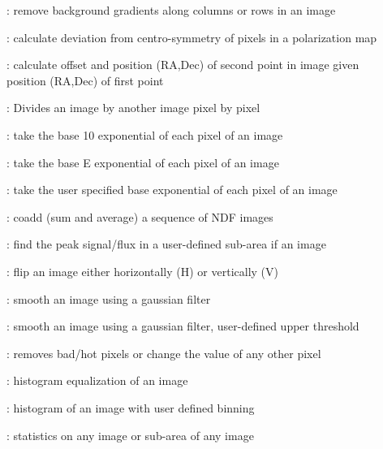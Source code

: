 \begin{description}
\begin{description}
\item []: remove background gradients along
columns or rows in an image

\item []: calculate deviation from
centro-symmetry of pixels in a polarization map

\item []: calculate offset and position (RA,Dec) of
second point in image given position (RA,Dec) of first point

\item []: Divides an image by another image pixel by
pixel

\item []: take the base 10 exponential of each
pixel of an image

\item []: take the base E exponential of each pixel
of an image

\item []: take the user specified base
exponential of each pixel of an image

\item []: coadd (sum and average) a sequence of
NDF images

\item []: find the peak signal/flux in a
user-defined sub-area if an image

\item []: flip an image either horizontally (H) or
vertically (V)

\item []: smooth an image using a gaussian filter

\item []: smooth an image using a gaussian
filter, user-defined upper threshold

\item []: removes bad/hot pixels or change the
value of any other pixel

\item []: histogram equalization of an image

\item []: histogram of an image with user
defined binning

\item []: statistics on any image or sub-area of
any image


\end{description}
\end{description}

